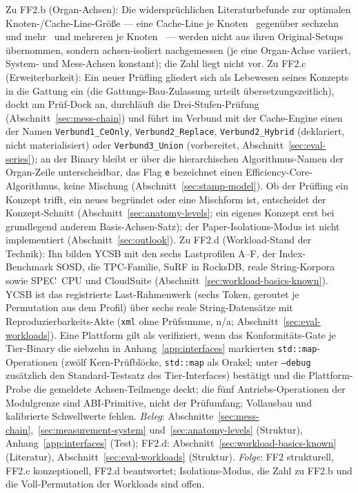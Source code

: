 \begin{nurkurz}
Zu FF2.b (Organ-Achsen): Die widersprüchlichen Literaturbefunde zur optimalen Knoten-/Cache-Line-Größe ---
eine Cache-Line je Knoten~\cite{rao1999css,rao2000csb} gegenüber sechzehn und
mehr~\cite{hankins2003nodesize}
und mehreren je Knoten~\cite{chen2001prefetch} --- werden nicht aus ihren Original-Setups übernommen,
sondern
achsen-isoliert nachgemessen (je eine Organ-Achse variiert, System- und Mess-Achsen konstant); die Zahl
liegt nicht vor. Zu FF2.c (Erweiterbarkeit): Ein neuer Prüfling gliedert sich
als Lebewesen seines Konzepts in die Gattung ein (die Gattungs-Bau-Zulassung urteilt übersetzungszeitlich), dockt am
Prüf-Dock an, durchläuft
die Drei-Stufen-Prüfung (Abschnitt~\ref{sec:mess-chain}) und führt im Verbund mit der Cache-Engine einen der
Namen \texttt{Verbund1\_CeOnly}, \texttt{Verbund2\_Replace}, \texttt{Verbund2\_Hybrid} (deklariert, nicht
materialisiert) oder \texttt{Verbund3\_Union} (vorbereitet, Abschnitt~\ref{sec:eval-series}); an der Binary
bleibt er über die hierarchischen Algorithmus-Namen der Organ-Zeile unterscheidbar, das Flag \texttt{e}
bezeichnet einen Efficiency-Core-Algorithmus, keine Mischung (Abschnitt~\ref{sec:stamp-model}). Ob der
Prüfling ein Konzept trifft, ein neues begründet oder eine Mischform ist, entscheidet der Konzept-Schnitt
(Abschnitt~\ref{sec:anatomy-levels}; ein eigenes Konzept erst bei grundlegend anderem Basis-Achsen-Satz);
der Paper-Isolations-Modus ist nicht implementiert
(Abschnitt~\ref{sec:outlook}). Zu FF2.d (Workload-Stand der Technik): Ihn bilden YCSB mit den sechs
Lastprofilen A--F, der Index-Benchmark SOSD, die TPC-Familie, SuRF in RocksDB, reale String-Korpora sowie
SPEC~CPU und CloudSuite (Abschnitt~\ref{sec:workload-basics-known}). YCSB ist das registrierte
Last-Rahmenwerk (sechs Token, geroutet je Permutation aus dem Profil) über sechs reale String-Datensätze
mit Reproduzierbarkeits-Akte (\texttt{xml} ohne Prüfsumme, n/a;
Abschnitt~\ref{sec:eval-workloads}). Eine Plattform gilt als
verifiziert, wenn das Konformitäts-Gate je Tier-Binary die siebzehn in Anhang~\ref{app:interfaces}
markierten \texttt{std::map}-Operationen (zwölf Kern-Prüfblöcke, \texttt{std::map} als Orakel; unter
\texttt{--debug} zusätzlich den Standard-Testsatz des Tier-Interfaces) bestätigt
und die Plattform-Probe die gemeldete Achsen-Teilmenge deckt;
die fünf Antriebs-Operationen der Modulgrenze sind ABI-Primitive, nicht der Prüfumfang; Vollausbau und
kalibrierte Schwellwerte fehlen.
\emph{Beleg}: Abschnitte~\ref{sec:mess-chain},~\ref{sec:measurement-system} und~\ref{sec:anatomy-levels}
(Struktur), Anhang~\ref{app:interfaces} (Test); FF2.d: Abschnitt~\ref{sec:workload-basics-known}
(Literatur), Abschnitt~\ref{sec:eval-workloads} (Struktur).
\emph{Folge}: FF2 strukturell, FF2.c konzeptionell, FF2.d beantwortet; Isolations-Modus, die Zahl zu FF2.b
und die Voll-Permutation der Workloads sind offen.
\end{nurkurz}

